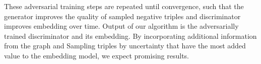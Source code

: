 These adversarial training steps are repeated until convergence, such that the generator improves the quality of sampled negative triples and discriminator improves embedding over time.
Output of our algorithm is the adversarially trained discriminator and its embedding.
By incorporating additional information from the graph and Sampling triples by uncertainty that have the most added value to the embedding model, we expect promising results.




















    





